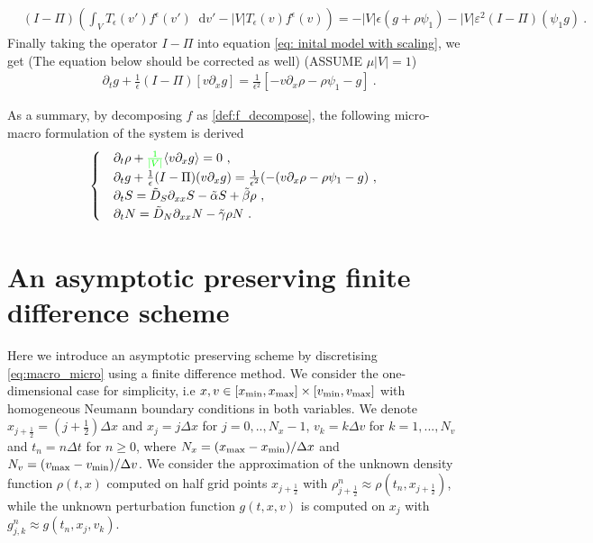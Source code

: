 \documentclass[11pt,twoside]{article}
\theoremstyle{nonumberplain}
\newcommand*\diff{\mathop{}\!\mathrm{d}}
\begin{document}
{\color{green} 
\begin{align*}
    & (I - \Pi) \left(\int_VT_\epsilon(v')f^\epsilon(v')\diff v'-|V|T_\epsilon(v)f^\epsilon(v)\right) = -|V|\epsilon\left(g+\rho \psi_1 \right) - |V|\varepsilon^2 (I-\Pi) (\psi_1 g)\ .
\end{align*}}
Finally taking the operator $I-\Pi$ into equation \eqref{eq: inital model with scaling}, we get {\color{red}(The equation below should be corrected as well)}
({\color{green}ASSUME  $\mu |V|=1$})
\begin{align*}
    &\partial_t g + \frac{1}{\epsilon} (I-\Pi)\left[v \partial_x g \right] 
    = \frac{1}{\epsilon^2}\left[-v\partial_x\rho-\rho \psi_1  - g\right] \ .
\end{align*}

As a summary, by decomposing $f$ as \eqref{def:f_decompose}, the following micro-macro formulation of the system is derived
\begin{align}\label{eq:macro_micro}
\begin{cases}
	&\partial_t \rho + {\color{green}\frac{1}{|V|}} \langle v\partial_x g\rangle  = 0\ , \\
	&\partial_t g + \frac{1}{\epsilon} (I-\Pi) ({v}\partial_x g) = \frac{1}{\epsilon^2}(-({v}\partial_x \rho-\rho\psi_1 -  g) \ ,\\
	&  \partial_t S = \tilde{D}_S\partial_{xx} S -\tilde{\alpha}S+\tilde{\beta}\rho\ ,\\
 & \partial_tN = \tilde{D}_N\partial_{xx} N-\tilde{\gamma}\rho N\ .
\end{cases}
\end{align}

\section{An asymptotic preserving finite difference scheme}

Here we introduce an asymptotic preserving scheme by discretising \eqref{eq:macro_micro} using a finite difference method. 
We consider the one-dimensional case for simplicity, i.e $x,v\in[x_{\textnormal{min}},x_{\textnormal{max}}]\times[v_{\textnormal{min}},v_{\textnormal{max}}]$ with homogeneous Neumann boundary conditions in both variables.
We denote  $x_{j+\frac{1}{2}}=(j+\frac{1}{2})\Delta x$ and $x_{j}=j\Delta x$ for $j=0,..,N_x-1$,  $v_k=k\Delta v$ for $ k=1,...,N_v$ and $t_n=n\Delta t$ for $n\geq 0$, where $ N_x=(x_{\textnormal{max}}-x_{\textnormal{min}})/\Delta x$ and $N_v=(v_{\textnormal{max}}-v_{\textnormal{min}})/\Delta v$. We consider the approximation of the unknown density function  $\rho(t,x)$ computed on half grid points $x_{j+\frac{1}{2}}$ with $\rho_{j+\frac{1}{2}}^n\approx\rho(t_n,x_{j+\frac{1}{2}})$, while the unknown perturbation function $g(t,x,v)$ is computed on  $x_{j}$ with $g_{j,k}^n\approx g(t_n,x_{j},v_k)$. %
\end{document}
